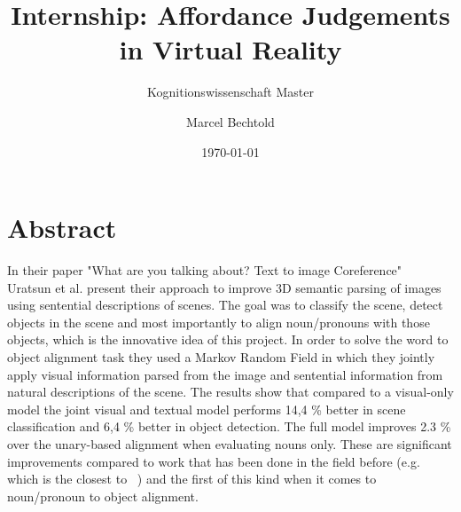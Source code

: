\documentclass{utue} %
\title{Internship: Affordance Judgements in Virtual Reality}
\author{Marcel Bechtold}
\date{\today}
\subtitle{Kognitionswissenschaft Master}
\begin{document}

\maketitle 
 
\section*{Abstract}  
In their paper "What are you talking about? Text to image Coreference" ~\cite{urtasun2014} Uratsun et al. present their approach to improve 3D semantic parsing of images using sentential descriptions of scenes. The goal was to classify the scene, detect objects in the scene and most importantly to align noun/pronouns with those objects, which is the innovative idea of this project. In order to solve the word to object alignment task they used a Markov Random Field in which they jointly apply visual information parsed from the image and sentential information from natural descriptions of the scene. The results show that compared to a visual-only model the joint visual and textual model performs 14,4 \% better in scene classification and 6,4 \% better in object detection. The full model improves 2.3 \% over the unary-based alignment when evaluating nouns only. These are significant improvements compared to work that has been done in the field before (e.g. ~\cite{fidler2013} which is the closest to ~\cite{urtasun2014}) and the first of this kind when it comes to noun/pronoun to object alignment.
  
  
\end{document}
